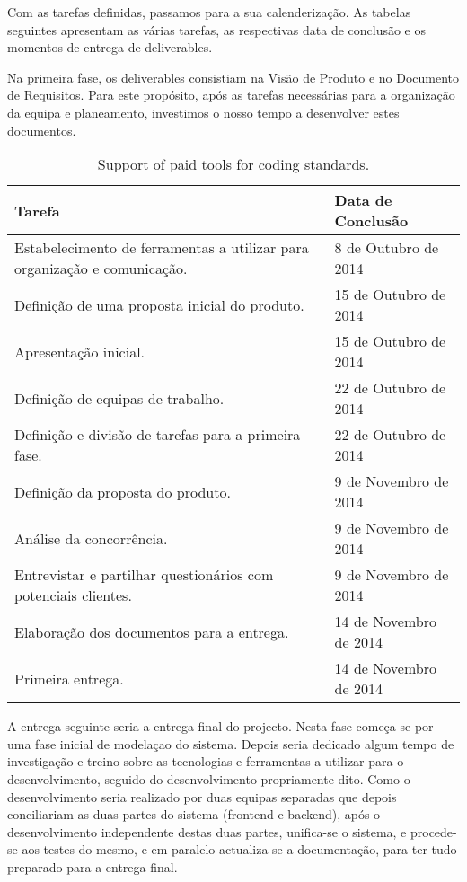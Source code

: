 
Com as tarefas definidas, passamos para a sua calenderização.
As tabelas seguintes apresentam as várias tarefas, as respectivas data de conclusão e os momentos de entrega de deliverables.

Na primeira fase, os deliverables consistiam na Visão de Produto e no Documento de Requisitos. Para este propósito, após as tarefas necessárias para a organização da equipa e planeamento, investimos o nosso tempo a desenvolver estes documentos.

\begin{table}[H]\centering
    \begin{tabular}{@{}p{}l@{}}\toprule
    Tarefa & Data de Conclusão \\
    \midrule
    Estabelecimento de ferramentas a utilizar para organização e comunicação.& 8 de Outubro de 2014 \\
    Definição de uma proposta inicial do produto. & 15 de Outubro de 2014 \\
    Apresentação inicial. & 15 de Outubro de 2014 \\
    Definição de equipas de trabalho. & 22 de Outubro de 2014 \\
    Definição e divisão de tarefas para a primeira fase. & 22 de Outubro de 2014 \\
    Definição da proposta do produto. & 9 de Novembro de 2014 \\
    Análise da concorrência. & 9 de Novembro de 2014 \\
    Entrevistar e partilhar questionários com potenciais clientes. & 9 de Novembro de 2014 \\
    Elaboração dos documentos para a entrega. & 14 de Novembro de 2014 \\
    Primeira entrega. & 14 de Novembro de 2014 \\
    \bottomrule
    \end{tabular}
    \caption{Support of paid tools for coding standards.}
    \label{tab:tool_support}
\end{table}

A entrega seguinte seria a entrega final do projecto.
Nesta fase começa-se por uma fase inicial de modelaçao do sistema. Depois seria dedicado algum tempo de investigação e treino sobre as tecnologias e ferramentas a utilizar para o desenvolvimento, seguido do desenvolvimento propriamente dito. Como o desenvolvimento seria realizado por duas equipas separadas que depois conciliariam as duas partes do sistema (frontend e backend), após o desenvolvimento independente destas duas partes, unifica-se o sistema, e procede-se aos testes do mesmo, e em paralelo actualiza-se a documentação, para ter tudo preparado para a entrega final.

